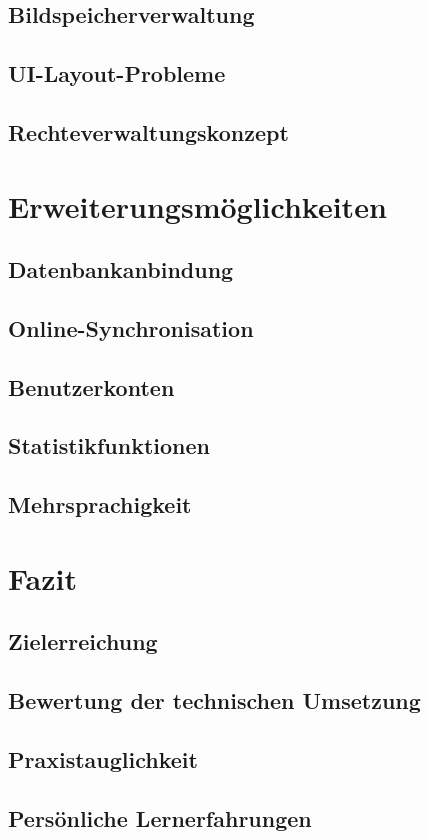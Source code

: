\documentclass[12pt,a4paper]{report}
\begin{document}
    \section{Bildspeicherverwaltung}
    \section{UI-Layout-Probleme}
    \section{Rechteverwaltungskonzept}


\chapter{Erweiterungsmöglichkeiten}


    \section{Datenbankanbindung}
    \section{Online-Synchronisation}
    \section{Benutzerkonten}
    \section{Statistikfunktionen}
    \section{Mehrsprachigkeit}


\chapter{Fazit}


    \section{Zielerreichung}
    \section{Bewertung der technischen Umsetzung}
    \section{Praxistauglichkeit}
    \section{Persönliche Lernerfahrungen}
\end{document}
